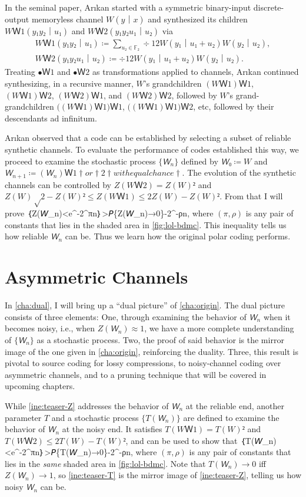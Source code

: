 \documentclass[openany]{amsbook}
\makeatletter
\numberwithin{equation}{chapter}
\numberwithin{figure}{chapter}
\numberwithin{table}{chapter}
\def\bigl@C#1{\bigl#1}					\def\bigr@C#1{\bigr#1}
\def\({\bigl@C(}	\def\){\bigr@C)}	令（{\Bigl(}			令）{\Bigr)}
\def\[#1\]{\begin{equation*}{#1}\end{equation*}}
\theoremstyle{definition}	理dfn:Definition~?s			理exa:Example~?s
\theoremstyle{remark}		理cla:Claim~?s				理rem:Remark~?s
\makeatother
\begin{document}
	In the seminal paper, Arıkan started with a symmetric binary-input
	discrete-output memoryless channel $W(y｜x)$ and synthesized
	its children $WＷ1(y₁y₂｜u₁)$ and $WＷ2(y₁y₂u₁｜u₂)$ via
	\begin{gather*}
		WＷ1(y₁y₂｜u₁)≔∑_{u₂∈𝔽₂}÷12W(y₁｜u₁+u₂)W(y₂｜u₂),	\\
		WＷ2(y₁y₂u₁｜u₂)≔÷12W(y₁｜u₁+u₂)W(y₂｜u₂).
	\end{gather*}
	Treating $•Ｗ1$ and $•Ｗ2$ as transformations applied to channels,
	Arıkan continued synthesizing, in a recursive manner,
	$W$'s grandchildren $(WＷ1)Ｗ1$, $(WＷ1)Ｗ2$, $(WＷ2)Ｗ1$, and $(WＷ2)Ｗ2$,
	followed by $W$'s grand-grandchildren $\((WＷ1)Ｗ1\)Ｗ1$, $\((WＷ1)Ｗ1\)Ｗ2$, etc,
	followed by their descendants ad infinitum.
	
	Arıkan observed that a code can be established by
	selecting a subset of reliable synthetic channels.
	To evaluate the performance of codes established this way,
	we proceed to examine the stochastic process $\{𝘞_n\}$ defined by
	$𝘞₀≔W$ and $𝘞_{n+1}≔(𝘞_n)Ｗ{1† or †2† with equal chance†}$.
	The evolution of the synthetic channels can be controlled by
	$Z(WＷ2)=Z(W)²$ and $Z(W)√{2-Z(W)²}≤Z(WＷ1)≤2Z(W)-Z(W)²$.
	From that I will prove
	\[𝘗｛Z(𝘞_n)<e^{-2^{πn}}｝>𝘗\{Z(𝘞_n)→0\}-2^{-ρn},\label{ine:teaser-Z}\]
	where $(π,ρ)$ is any pair of constants that
	lies in the shaded area in \cref{fig:lol-bdmc}.
	This inequality tells us how reliable $𝘞_n$ can be.
	Thus we learn how the original polar coding performs.

\section{Asymmetric Channels}

	In \cref{cha:dual}, I will bring up a “dual picture” of \cref{cha:origin}.
	The dual picture consists of three elements:
	One, through examining the behavior of $𝘞_n$ when it becomes noisy,
	i.e., when $Z(𝘞_n)≈1$, we have a more complete
	understanding of $\{𝘞_n\}$ as a stochastic process.
	Two, the proof of said behavior is the mirror image of the one
	given in \cref{cha:origin}, reinforcing the duality.
	Three, this result is pivotal to source coding for lossy compressions,
	to noisy-channel coding over asymmetric channels,
	and to a pruning technique that will be covered in upcoming chapters.
	
	While \cref{ine:teaser-Z} addresses the behavior of $𝘞_n$ at the reliable end,
	another parameter $T$ and a stochastic process $\{T(𝘞_n)\}$
	are defined to examine the behavior of $𝘞_n$ at the noisy end.
	It satisfies $T(WＷ1)=T(W)²$ and $T(WＷ2)≤2T(W)-T(W)²$,
	and can be used to show that
	\[𝘗｛T(𝘞_n)<e^{-2^{πn}}｝>𝘗\{T(𝘞_n)→0\}-2^{-ρn},\label{ine:teaser-T}\]
	where $(π,ρ)$ is any pair of constants that
	lies in the \emph{same} shaded area in \cref{fig:lol-bdmc}.
	Note that $T(𝘞_n)→0$ iff $Z(𝘞_n)→1$, so \cref{ine:teaser-T} is the
	mirror image of \cref{ine:teaser-Z}, telling us how noisy $𝘞_n$ can be.
	
\end{document}
